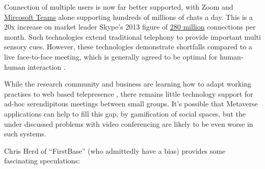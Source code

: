 Connection of multiple users is now far better supported, with Zoom and \href{https://www.microsoft.com/en-us/Investor/earnings/FY-2021-Q1/press-release-webcast}{Mircosoft Teams} alone supporting hundreds of millions of chats a day. This is a 20x increase on market leader Skype's 2013 figure of \href{https://www.microsoft.com/en-us/Investor/earnings/FY-2013-Q1/press-release-webcast}{280 million} connections per month. Such technologies extend traditional telephony to provide important multi sensory cues.  However, these technologies demonstrate shortfalls compared to a live face-to-face meeting, which is generally agreed to be optimal for human-human interaction \cite{Wolff2008}.\par
While the research community and business are learning how to adapt working practises to web based telepresence \cite{oeppen2020human}, there remains little technology support for ad-hoc serendipitous meetings between small groups. It's possible that Metaverse applications can help to fill this gap, by gamification of social spaces, but the under discussed problems with video conferencing are likely to be even worse in such systems. \par
Chris Herd of ``FirstBase'' (who admittedly have a bias) provides some fascinating speculations: \par
